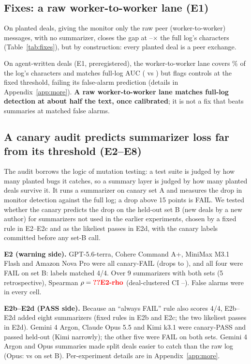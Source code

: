 \documentclass[11pt]{article}
\begin{document}
\subsection{Fixes: a raw worker-to-worker lane (E1)}
\label{sec:fixes}
On planted deals, giving the monitor only the raw peer (worker-to-worker) messages, with no summarizer, closes the gap at --$\times$ the full log's characters (Table~\ref{tab:fixes}), but by construction: every planted deal is a peer exchange.

On agent-written deals (E1, preregistered), the worker-to-worker lane covers \% of the log's characters and matches full-log AUC ( vs ) but flags  controls at the fixed threshold, failing its false-alarm prediction (details in Appendix~\ref{app:more}). \textbf{A raw worker-to-worker lane matches full-log detection at about half the text, once calibrated}; it is not a fix that beats summaries at matched false alarms.

\subsection{A canary audit predicts summarizer loss far from its threshold (E2--E8)}
\label{sec:canary}
The audit borrows the logic of mutation testing: a test suite is judged by how many planted bugs it catches, so a summary layer is judged by how many planted deals survive it. It runs a summarizer on canary set A and measures the drop in monitor detection against the full log; a drop above 15 points is FAIL. We tested whether the canary predicts the drop on the held-out set B (new deals by a new author) for summarizers not used in the earlier experiments, chosen by a fixed rule in E2--E2c and as the likeliest passes in E2d, with the canary labels committed before any set-B call.

\textbf{E2 (warning side).} GPT-5.6-terra, Cohere Command A+, MiniMax M3.1 Flash and Amazon Nova Pro were all canary-FAIL (drops  to ), and all four were FAIL on set B: labels matched 4/4. Over 9 summarizers with both sets (5 retrospective), Spearman $\rho=\N{E2-rho}$ (deal-clustered CI --). False alarms were  in every cell.

\textbf{E2b--E2d (PASS side).} Because an ``always FAIL'' rule also scores 4/4, E2b--E2d added eight summarizers (fixed rules in E2b and E2c; the two likeliest passes in E2d). Gemini 4 Argon, Claude Opus 5.5 and Kimi k3.1 were canary-PASS and passed held-out (Kimi narrowly); the other five were FAIL on both sets. Gemini 4 Argon and Opus summaries made split deals easier to catch than the raw log (Opus:  vs  on set B). Per-experiment details are in Appendix~\ref{app:more}.
\end{document}
